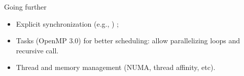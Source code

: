 \begin{frame}{Going further}
	\begin{itemize}
		\item Explicit synchronization (e.g., ) ;
		\item Tasks (OpenMP 3.0) for better scheduling: allow parallelizing  loops and recursive call. 
		\item Thread and memory management (NUMA, thread affinity, etc).
	\end{itemize}
\end{frame}